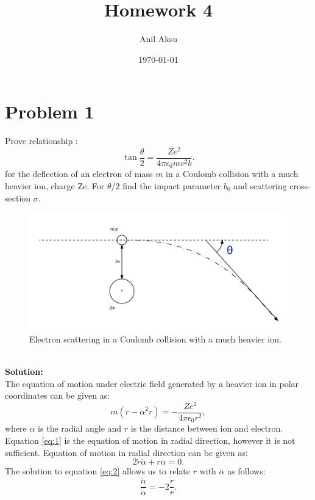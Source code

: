 \documentclass[11pt]{amsart}
\title{Homework 4}
\author{Anil Aksu}
\date{\today}
\begin{document}
\maketitle

\section*{Problem 1 }
Prove relationship : 
\begin{equation*}
\tan \frac{\theta}{2}=\frac{Z e^2 }{4 \pi \epsilon_0 m v^2 b}.
\end{equation*}
for the deflection of an electron of mass $m$ in a Coulomb collision with a much heavier ion, charge Ze. For $\theta /2 $ find the impact parameter $b_0$ and scattering cross-section $\sigma$.
\begin{figure}[h!]
\label{fig:1}
\centering
\includegraphics[width = 5in]{ElectronDeviation.png}
\caption{Electron scattering in a Coulomb collision with a much heavier ion. }
\end{figure}
\\
\textbf{Solution:}\\
The equation of motion under electric field generated by a heavier ion in polar coordinates can be given as:
\begin{equation}
\label{eq:1}
m(\ddot{r}-\dot{\alpha}^2 r)=-\frac{Ze^2}{4 \pi \epsilon_0 r^2},
\end{equation}
where $\alpha$ is the radial angle and $r$ is the distance between ion and electron. Equation \ref{eq:1} is the equation of motion in radial direction, however it is not sufficient. Equation of motion in radial direction can be given as:
\begin{equation}
\label{eq:2}
2\dot{r}\dot{\alpha}+r\ddot{\alpha}=0.
\end{equation}
The solution to equation \ref{eq:2} allows us to relate $r$ with $\dot{\alpha}$ as follows:
\begin{equation}
\label{eq:3}
\frac{\ddot{\alpha}}{\dot{\alpha}}=-2\frac{\dot{r}}{r}.
\end{equation}
\end{document}
